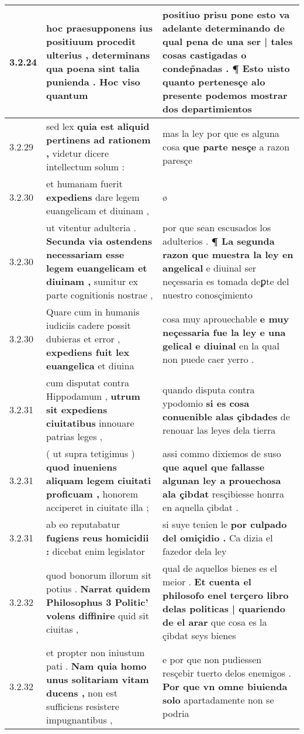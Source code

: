 \begin{tabular}{|p{1cm}|p{6.5cm}|p{6.5cm}|}
3.2.24 & hoc praesupponens ius positiuum procedit ulterius , \textbf{ determinans qua poena sint talia punienda . } Hoc viso quantum & positiuo prisu pone esto va adelante \textbf{ determinando de qual pena de una ser | tales cosas castigadas o condep̃nadas . } ¶ Esto uisto quanto pertenesçe alo presente podemos mostrar dos departimientos \\\hline
3.2.29 & sed lex \textbf{ quia est aliquid pertinens ad rationem , } videtur dicere intellectum solum : & mas la ley por que es alguna cosa \textbf{ que parte nesçe } a razon paresçe \\\hline
3.2.30 & et humanam fuerit \textbf{ expediens } dare legem euangelicam et diuinam , & ø \\\hline
3.2.30 & ut vitentur adulteria . \textbf{ Secunda via ostendens necessariam esse legem euangelicam et diuinam , } sumitur ex parte cognitionis nostrae , & por que sean escusados los adulterios . \textbf{ ¶ La segunda razon que muestra la ley en angelical } e diuinal ser neçessaria es tomada deꝑte del nuestro conosçimiento \\\hline
3.2.30 & Quare cum in humanis iudiciis cadere possit dubieras et error , \textbf{ expediens fuit lex euangelica } et diuina & cosa muy aprouechable \textbf{ e muy neçessaria fue la ley e una gelical e diuinal } en la qual non puede caer yerro . \\\hline
3.2.31 & cum disputat contra Hippodamum , \textbf{ utrum sit expediens ciuitatibus } innouare patrias leges , & quando disputa contra ypodomio \textbf{ si es cosa conuenible alas çibdades } de renouar las leyes dela tierra \\\hline
3.2.31 & ( ut supra tetigimus ) \textbf{ quod inueniens aliquam legem ciuitati proficuam , } honorem acciperet in ciuitate illa ; & assi commo dixiemos de suso \textbf{ que aquel que fallasse algunan ley a prouechosa ala çibdat } resçibiesse honrra en aquella çibdat . \\\hline
3.2.31 & ab eo reputabatur \textbf{ fugiens reus homicidii : } dicebat enim legislator & si suye tenien le \textbf{ por culpado del omiçidio . } Ca dizia el fazedor dela ley \\\hline
3.2.32 & quod bonorum illorum sit potius . \textbf{ Narrat quidem Philosophus 3 Politic’ volens diffinire } quid sit ciuitas , & qual de aquellos bienes es el meior . \textbf{ Et cuenta el philosofo enel terçero libro delas politicas | quariendo de el arar } que cosa es la çibdat seys bienes \\\hline
3.2.32 & et propter non iniustum pati . \textbf{ Nam quia homo unus solitariam vitam ducens , } non est sufficiens resistere impugnantibus , & e por que non pudiessen resçebir tuerto delos enemigos . \textbf{ Por que vn omne biuienda solo } apartadamente non se podria \\\hline

\end{tabular}
